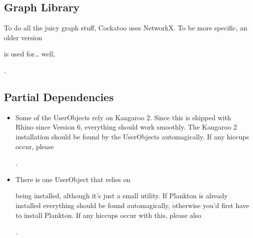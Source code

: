 \documentclass[letterpaper,10pt,english]{sphinxmanual}
\begin{document}
\subsection{Graph Library}
\label{\detokenize{README:graph-library}}
To do all the juicy graph stuff, Cockatoo uses NetworkX. To be more
specific, an older version \sphinxhyphen{} %
\begin{footnote}[27]\sphinxAtStartFootnote
{}
%
\end{footnote} is used
for… well,
%
\begin{footnote}[28]\sphinxAtStartFootnote
{}
%
\end{footnote}.


\subsection{Partial Dependencies}
\label{\detokenize{README:partial-dependencies}}\begin{itemize}
\item {} 
Some of the UserObjects rely on Kangaroo 2. Since this is shipped
with Rhino since Version 6, everything should work smoothly. The
Kangaroo 2 installation should be found by the UserObjects
automagically. If any hiccups occur, please %
\begin{footnote}[29]\sphinxAtStartFootnote
{}
%
\end{footnote}.

\item {} 
There is one UserObject that relies on
%
\begin{footnote}[30]\sphinxAtStartFootnote
{}
%
\end{footnote} being installed,
although it’s just a small utility. If Plankton is already installed
everything should be found automagically, otherwise you’d first have
to install Plankton. If any hiccups occur with this, please also %
\begin{footnote}[31]\sphinxAtStartFootnote
{}
%
\end{footnote}.

\end{itemize}
\end{document}
